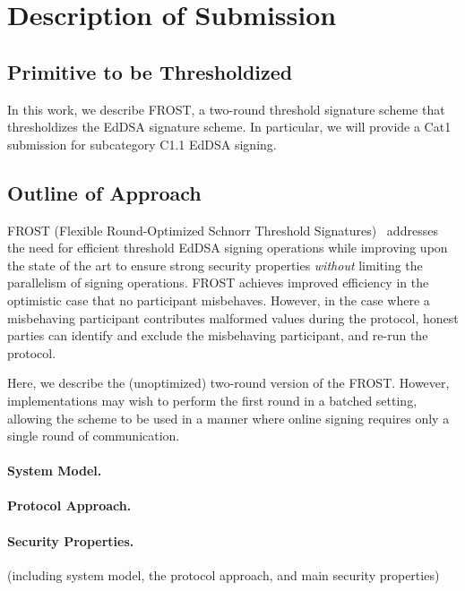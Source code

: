 \section{Description of Submission}

\subsection{Primitive to be Thresholdized}

In this work, we describe FROST, a two-round threshold signature
scheme that thresholdizes the EdDSA signature scheme. In particular,
we will provide a Cat1 submission for subcategory C1.1 EdDSA signing.

\subsection{Outline of Approach}

FROST (Flexible Round-Optimized Schnorr Threshold Signatures)~\cite{KomloG20,BellareCKMTZ22}
addresses the need for efficient threshold EdDSA signing operations while
improving upon the state of the art to ensure strong security properties
\emph{without} limiting the parallelism of signing operations.
FROST achieves improved efficiency in the optimistic case that no
participant misbehaves. However, in the case where a misbehaving participant 
contributes malformed values during the protocol, honest parties can identify
and exclude the misbehaving participant, and re-run the protocol.

Here, we describe the (unoptimized) two-round version of the FROST.
However, implementations may wish to perform the first round in a
batched setting, allowing the scheme to be used in a manner where
online signing requires only a single round of communication.

\paragraph{System Model.}

\paragraph{Protocol Approach.}

\paragraph{Security Properties.}
(including system model, the protocol approach, and main security properties)


